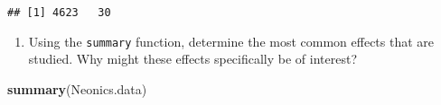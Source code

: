 \documentclass[]{article}
\newenvironment{Shaded}{\begin{snugshade}}{\end{snugshade}}
\newcommand{\KeywordTok}[1]{\textcolor[rgb]{0.13,0.29,0.53}{\textbf{#1}}}
\newcommand{\NormalTok}[1]{#1}
\providecommand{\tightlist}{%
  \setlength{\itemsep}{0pt}\setlength{\parskip}{0pt}}
\begin{document}
\begin{verbatim}
## [1] 4623   30
\end{verbatim}

\begin{enumerate}
\def\labelenumi{\arabic{enumi}.}
\setcounter{enumi}{5}
\tightlist
\item
  Using the \texttt{summary} function, determine the most common effects
  that are studied. Why might these effects specifically be of interest?
\end{enumerate}

\begin{Shaded}
\begin{Highlighting}[]
\KeywordTok{summary}\NormalTok{(Neonics.data)}
\end{Highlighting}
\end{Shaded}
\end{document}
